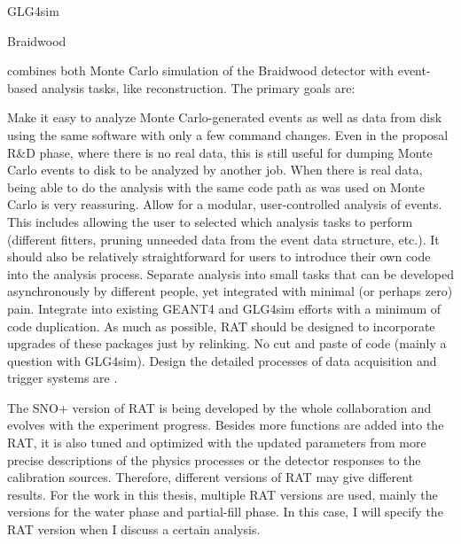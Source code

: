 GLG4sim


Braidwood

combines both Monte Carlo simulation of the Braidwood detector with event-based analysis tasks, like reconstruction. The primary goals are:

Make it easy to analyze Monte Carlo-generated events as well as data from disk using the same software with only a few command changes. Even in the proposal R\&D phase, where there is no real data, this is still useful for dumping Monte Carlo events to disk to be analyzed by another job. When there is real data, being able to do the analysis with the same code path as was used on Monte Carlo is very reassuring.
Allow for a modular, user-controlled analysis of events. This includes allowing the user to selected which analysis tasks to perform (different fitters, pruning unneeded data from the event data structure, etc.). It should also be relatively straightforward for users to introduce their own code into the analysis process.
Separate analysis into small tasks that can be developed asynchronously by different people, yet integrated with minimal (or perhaps zero) pain.
Integrate into existing GEANT4 and GLG4sim efforts with a minimum of code duplication. As much as possible, RAT should be designed to incorporate upgrades of these packages just by relinking. No cut and paste of code (mainly a question with GLG4sim).
Design the detailed processes of data acquisition and trigger systems are \cite{whitepaper}.

The SNO+ version of RAT is being developed by the whole collaboration and evolves with the experiment progress.
Besides more functions are added into the RAT, it is also tuned and optimized with the updated parameters from more precise descriptions of the physics processes or the detector responses to the calibration sources. Therefore, different versions of RAT may give different results. For the work in this thesis, multiple RAT versions are used, mainly the versions for the water phase and partial-fill phase. In this case, I will specify the RAT version when I discuss a certain analysis.
\cite{ratManual}
